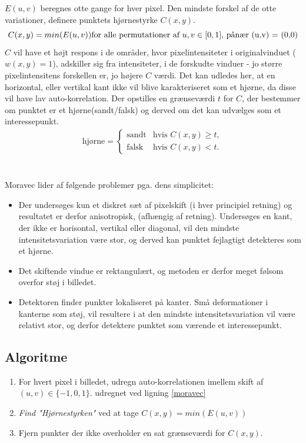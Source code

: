 $E(u,v)$ beregnes otte gange for hver pixel. Den mindste forskel af de otte variationer, definere punktets hjørnestyrke $C(x,y)$.
$$
C(x,y)=min(E(u,v)) \text{$ $for alle permutationer af $u,v \in [0,1]$, pånær (u,v) = (0,0)}
$$
$C$ vil have et højt respons i de områder, hvor pixelintensiteter i originalvinduet ($w(x,y) = 1$), adskiller sig fra intensiteter, i de forskudte vinduer - jo større pixelintensitens forskellen er, jo højere $C$ værdi.
Det kan udledes her, at en horizontal, eller vertikal kant ikke vil blive karakteriseret som et hjørne, da disse vil have lav auto-korrelation. 
Der opstilles en grænseværdi $t$ for $C$, der bestemmer om punktet er et hjørne(sandt/falsk) og derved om det kan udvælges som et interessepunkt.
\begin{equation}
\begin{split}
\text{hjørne} = 
\begin{cases}
\text{sandt}& \text{hvis } C(x,y)\geq t, \\
\text{falsk }& \text{hvis } C(x,y) < t.
\end{cases}
\end{split}
\label{cornerind}
\end{equation}
 \\ \\
Moravec lider af følgende problemer pga. dens simplicitet:
\begin{itemize}
\item{Der undersøges kun et diskret sæt af pixelskift (i hver principiel retning) og resultatet er derfor anisotropisk, (afhængig af retning). Undersøges en kant, der ikke er horisontal, vertikal eller diagonal, vil den mindste intensitetsvariation være stor, og derved kan punktet fejlagtigt detekteres som et hjørne.}
\item{Det skiftende vindue er rektangulært, og metoden er derfor meget følsom overfor støj i billedet.}
\item{Detektoren finder punkter lokaliseret på kanter. Små deformationer i kanterne som støj, vil resultere i at den mindste intensitetsvariation vil være relativt stor, og derfor detektere punktet som værende et interessepunkt.}
\end{itemize}
\subsection{Algoritme}
\begin{enumerate}
\item{For hvert pixel i billedet, udregn auto-korrelationen imellem skift af $(u,v) \in \lbrace-1,0,1\rbrace$. udregnet ved ligning \ref{moravec}}
\item{\textit{Find "Hjørnestyrken"} ved at tage $C(x,y)=min(E(u,v))$}
\item{Fjern punkter der ikke overholder en sat grænseværdi for $C(x,y)$.}
\end{enumerate}
